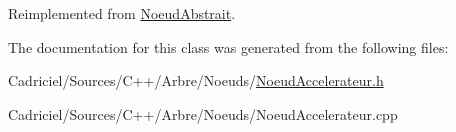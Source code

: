 Reimplemented from \hyperlink{group__inf2990_gadc6ebe69894dbb682fdd0ecb1b6c11e9}{Noeud\-Abstrait}.



The documentation for this class was generated from the following files\-:\begin{DoxyCompactItemize}
\item 
Cadriciel/\-Sources/\-C++/\-Arbre/\-Noeuds/\hyperlink{_noeud_accelerateur_8h}{Noeud\-Accelerateur.\-h}\item 
Cadriciel/\-Sources/\-C++/\-Arbre/\-Noeuds/Noeud\-Accelerateur.\-cpp\end{DoxyCompactItemize}
